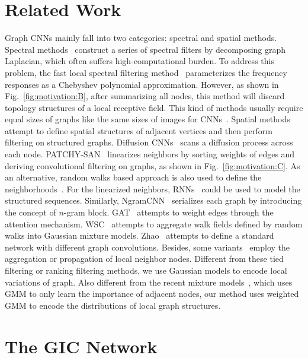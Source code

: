 \documentclass[letterpaper]{article} \usepackage{aaai19}  \usepackage{times}  \usepackage{helvet}  \usepackage{courier}  \usepackage{url}  \usepackage{graphicx}  \frenchspacing  \setlength{\pdfpagewidth}{8.5in}  \setlength{\pdfpageheight}{11in}
\begin{document}
\section{Related Work}

Graph CNNs mainly fall into two categories: spectral and spatial methods. Spectral methods~\cite{bruna2013spectral,scarselli2009graph,henaff2015deep,such2017robust,li2018action,li2018spatio} construct a series of spectral filters by decomposing graph Laplacian, which often suffers high-computational burden. To address this problem, the fast local spectral filtering method~\cite{defferrard2016convolutional} parameterizes the frequency responses as a Chebyshev polynomial approximation. However, as shown in Fig.~\ref{fig:motivation:B}, after summarizing all nodes, this method will discard topology structures of a local receptive field. This kind of methods usually require equal sizes of graphs like the same sizes of images for CNNs~\cite{kipf2016semi}. Spatial methods attempt to define spatial structures of adjacent vertices and then perform filtering on structured graphs. Diffusion CNNs~\cite{atwood2016diffusion} scans a diffusion process across each node. PATCHY-SAN~\cite{niepert2016learning} linearizes neighbors by sorting weights of edges and deriving convolutional filtering on graphs, as shown in Fig.~\ref{fig:motivation:C}. As an alternative, random walks based approach is also used to define the neighborhoods~\cite{perozzi2014deepwalk}. For the linearized neighbors, RNNs~\cite{li2015gated} could be used to model the structured sequences. Similarly, NgramCNN~\cite{luo2017deep} serializes each graph by introducing the concept of $n$-gram block. 
GAT~\cite{velickovic2017graph} attempts to weight edges through the attention mechanism. WSC~\cite{jiang2018walk} attempts to aggregate walk fields defined by random walks into Gaussian mixture models. Zhao~\cite{zhao2018work} attempts to define a standard network with different graph convolutions. Besides, some variants~\cite{hamilton2017inductive,duran2017learning,zhang2018tensor} employ the aggregation or propagation of local neighbor nodes. Different from these tied filtering or ranking filtering methods, we use Gaussian models to encode local variations of graph. Also different from the recent mixture models~\cite{monti2017geometric}, which uses GMM to only learn the importance of adjacent nodes, our method uses weighted GMM to encode the distributions of local graph structures.


\section{The GIC Network}
\end{document}
